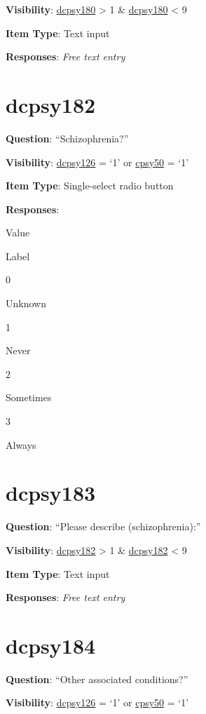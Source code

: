 \documentclass[]{book}
\begin{document}
\textbf{Visibility}: \protect\hyperlink{dcpsy180}{dcpsy180} \textgreater{} 1 \& \protect\hyperlink{dcpsy180}{dcpsy180} \textless{} 9

\textbf{Item Type}: Text input

\textbf{Responses}: \emph{Free text entry}

\hypertarget{dcpsy182}{%
\section{dcpsy182}\label{dcpsy182}}

\textbf{Question}: ``Schizophrenia?''

\textbf{Visibility}: \protect\hyperlink{dcpsy126}{dcpsy126} = `1' or \protect\hyperlink{cpsy50}{cpsy50} = `1'

\textbf{Item Type}: Single-select radio button

\textbf{Responses}:

Value

Label

0

Unknown

1

Never

2

Sometimes

3

Always

\hypertarget{dcpsy183}{%
\section{dcpsy183}\label{dcpsy183}}

\textbf{Question}: ``Please describe (schizophrenia):''

\textbf{Visibility}: \protect\hyperlink{dcpsy182}{dcpsy182} \textgreater{} 1 \& \protect\hyperlink{dcpsy182}{dcpsy182} \textless{} 9

\textbf{Item Type}: Text input

\textbf{Responses}: \emph{Free text entry}

\hypertarget{dcpsy184}{%
\section{dcpsy184}\label{dcpsy184}}

\textbf{Question}: ``Other associated conditions?''

\textbf{Visibility}: \protect\hyperlink{dcpsy126}{dcpsy126} = `1' or \protect\hyperlink{cpsy50}{cpsy50} = `1'
\end{document}

